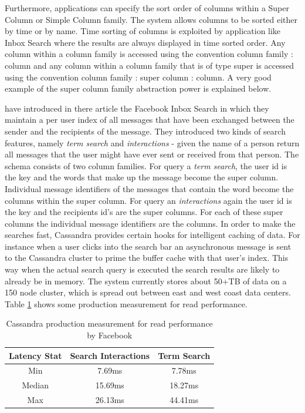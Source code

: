 Furthermore, applications can specify the sort order of columns within a Super Column or Simple Column family. The system allows columns to be sorted either by time or by name. Time sorting of columns is exploited by application like Inbox Search where the results are always displayed in time sorted order. Any column within a column family is accessed using the convention column family : column and any column within a column family that is of type super is accessed using the convention column family : super column : column. A very good example of the super column family abstraction power is explained below.

\citeauthor{Lakshman:2010} have introduced in there article \cite{Lakshman:2010} the Facebook Inbox Search in which they maintain a per user index of all messages that have been exchanged between the sender and the recipients of the message. They introduced two kinds of search features, namely \textit{term search} and \textit{interactions} - given the name of a person return all messages that the user might have ever sent or received from that person. The schema consists of two column families. For query a \textit{term search}, the user id is the key and the words that make up the message become the super column. Individual message identifiers of the messages that contain the word become the columns within the super column. For query an \textit{interactions} again the user id is the key and the recipients id's are the super columns. For each of these super columns the individual message identifiers are the columns. In order to make the searches fast, Cassandra provides certain hooks for intelligent caching of data. For instance when a user clicks into the search bar an asynchronous message is sent to the Cassandra cluster to prime the buffer cache with that user's index. This way when the actual search query is executed the search results are likely to already be in memory. The system currently stores about 50+TB of data on a 150 node cluster, which is spread out between east and west coast data centers. Table \ref{tbl:nosql_cas} shows some production measurement for read performance.

\begin{table}[htb]
\begin{tabular}{|c|c|c|}
\hline 
Latency Stat & Search Interactions & Term Search \\ 
\hline 
Min & 7.69ms & 7.78ms \\ 
\hline 
Median & 15.69ms & 18.27ms \\ 
\hline 
Max & 26.13ms & 44.41ms \\ 
\hline 
\end{tabular} 
\caption{Cassandra production measurement for read performance by Facebook}
\label{tbl:nosql_cas}
\protect\cite{Lakshman:2010}
\end{table}

